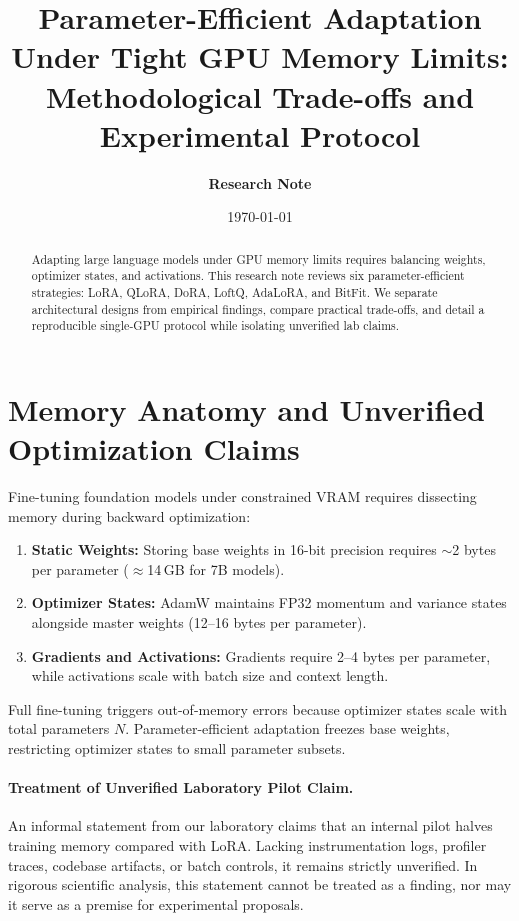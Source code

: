 \documentclass[11pt,a4paper]{article}
\title{\textbf{Parameter-Efficient Adaptation Under Tight GPU Memory Limits:\\Methodological Trade-offs and Experimental Protocol}}
\author{\textbf{Research Note}}
\date{\today}
\begin{document}
\maketitle

\begin{abstract}
Adapting large language models under GPU memory limits requires balancing weights, optimizer states, and activations. This research note reviews six parameter-efficient strategies: LoRA, QLoRA, DoRA, LoftQ, AdaLoRA, and BitFit. We separate architectural designs from empirical findings, compare practical trade-offs, and detail a reproducible single-GPU protocol while isolating unverified lab claims.
\end{abstract}

\section{Memory Anatomy and Unverified Optimization Claims}

Fine-tuning foundation models under constrained VRAM requires dissecting memory during backward optimization:
\begin{enumerate}
    \item \textbf{Static Weights:} Storing base weights in 16-bit precision requires $\sim$2 bytes per parameter ($\approx$14\,GB for 7B models).
    \item \textbf{Optimizer States:} AdamW maintains FP32 momentum and variance states alongside master weights (12--16 bytes per parameter).
    \item \textbf{Gradients and Activations:} Gradients require 2--4 bytes per parameter, while activations scale with batch size and context length.
\end{enumerate}

Full fine-tuning triggers out-of-memory errors because optimizer states scale with total parameters $N$. Parameter-efficient adaptation freezes base weights, restricting optimizer states to small parameter subsets.

\paragraph{Treatment of Unverified Laboratory Pilot Claim.}
An informal statement from our laboratory claims that an internal pilot halves training memory compared with LoRA. Lacking instrumentation logs, profiler traces, codebase artifacts, or batch controls, it remains strictly unverified. In rigorous scientific analysis, this statement cannot be treated as a finding, nor may it serve as a premise for experimental proposals.
\end{document}
